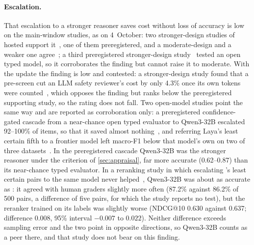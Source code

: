 \paragraph{Escalation.}
That escalation to a stronger reasoner saves cost without loss of accuracy is low on the main-window studies, as on 4~October: two stronger-design studies of hosted \jev{} support it~\cite{arx26550,arx24574}, one of them preregistered, and a moderate-design and a weaker one agree~\cite{arx26532,arx02046}; a third preregistered stronger-design study~\cite{zen22922769}\zmark{} tested an open typed model, so it corroborates the finding but cannot raise it to moderate.
With the update the finding is low and contested: a stronger-design study found that a \jev{} pre-screen cut an LLM safety reviewer's cost by only 4.3\% once its own tokens were counted~\cite{arx02267}, which opposes the finding but ranks below the preregistered supporting study, so the rating does not fall.
Two open-model studies point the same way and are reported as corroboration only: a preregistered confidence-gated cascade from a near-chance open typed evaluator to Qwen3-32B escalated 92--100\% of items, so that it saved almost nothing~\cite{arx07177}, and referring Laya's least certain fifth to a frontier model left macro-F1 below that model's own on two of three datasets~\cite{arx03324}.
In the preregistered cascade Qwen3-32B was the stronger reasoner under the criterion of \cref{sec:appraisal}, far more accurate (0.62--0.87) than its near-chance typed evaluator.
In a reranking study in which escalating \jev{}'s least certain pairs to the same model never helped~\cite{arx09188}, Qwen3-32B was about as accurate as \jev{}: it agreed with human graders slightly more often (87.2\% against 86.2\% of 500 pairs, a difference of five pairs, for which the study reports no test), but the reranker trained on its labels was slightly worse (NDCG@10 0.630 against 0.637; difference 0.008, 95\% interval $-0.007$ to $0.022$).
Neither difference exceeds sampling error and the two point in opposite directions, so Qwen3-32B counts as a peer there, and that study does not bear on this finding.

